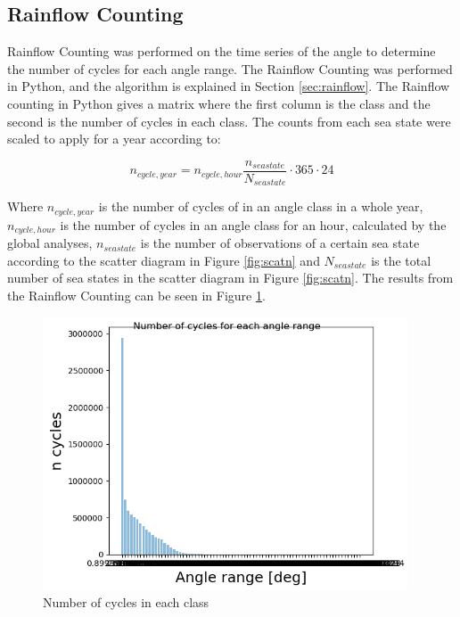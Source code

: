 \subsection{Rainflow Counting}
 Rainflow Counting was performed on the time series of the angle to determine the number of cycles for each angle range. The Rainflow Counting was performed in Python, and the algorithm is explained in Section \ref{sec:rainflow}. The Rainflow counting in Python gives a matrix where the first column is the class and the second is the number of cycles in each class. The counts from each sea state were scaled to apply for a year according to:

\begin{equation}
    n_{cycle,year}=n_{cycle,hour} \frac{n_{seastate}}{N_{seastate}} \cdot 365 \cdot 24 
\end{equation}

\noindent Where $n_{cycle,year}$ is the number of cycles of in an angle class in a whole year, $n_{cycle,hour}$ is the number of cycles in an angle class for an hour, calculated by the global analyses, $n_{seastate}$ is the number of observations of a certain sea state according to the scatter diagram in Figure \ref{fig:scatn} and $N_{seastate}$ is the total number of sea states in the scatter diagram in Figure \ref{fig:scatn}.\newline
\newline 
\noindent The results from the Rainflow Counting can be seen in Figure \ref{fig:initialcyc}.  

\begin{figure}[H]
\centering
\includegraphics[scale=0.9]{figures/initialcyc}
\caption[Number of cycles in each class]{Number of cycles in each class}
 \label{fig:initialcyc}
\end{figure}

